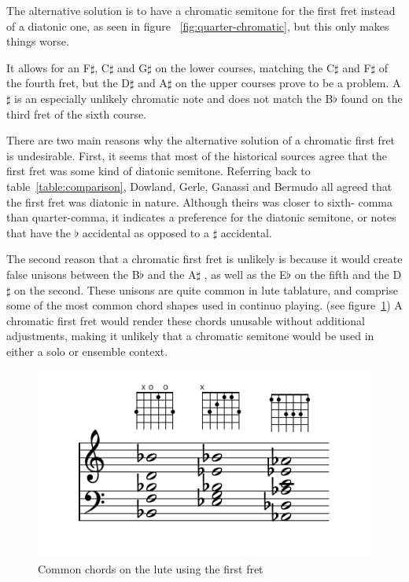 The alternative solution is to have a chromatic semitone for the first fret instead of a
diatonic one, as seen in figure ~\ref{fig:quarter-chromatic}, but this only makes things
worse.

It allows for an F$\sharp$, C$\sharp$ and G$\sharp$ on the lower courses, matching the
C$\sharp$ and F$\sharp$ of the fourth fret, but the D$\sharp$ and A$\sharp$ on the
upper courses prove to be a problem. A$\sharp$ is an especially unlikely chromatic
note and does not match the B$\flat$ found on the third fret of the sixth course.

There are two main reasons why the alternative solution of a chromatic first
fret is undesirable. First, it seems that most of the historical sources agree
that the first fret was some kind of diatonic semitone.  Referring back to
table~\ref{table:comparison}, Dowland, Gerle, Ganassi and Bermudo all agreed
that the first fret was diatonic in nature. Although theirs was closer to sixth-
comma than quarter-comma, it indicates a preference for the diatonic semitone,
or notes that have the $\flat$ accidental as opposed to a $\sharp$ accidental.

The second reason that a chromatic first fret is unlikely is because it would
create false unisons between the B$\flat$ and the A$\sharp$ , as well as the
E$\flat$ on the fifth and the D$\sharp$ on the second. These unisons are quite
common in lute tablature, and comprise some of the most common chord shapes used
in continuo playing. (see figure~\ref{first-fret-lute-chords}) A chromatic first
fret would render these  chords unusable without additional adjustments, making
it unlikely that a chromatic semitone would be used in either a solo or ensemble
context.

\begin{figure}[h]
\centering
\includegraphics{examples/first-fret-lute-chords.pdf}
\caption{Common chords on the lute using the first fret}
\label{first-fret-lute-chords}
\end{figure}

